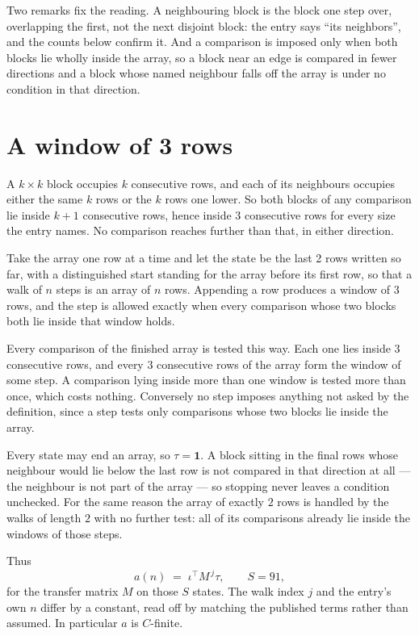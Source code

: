 \documentclass[11pt,a4paper]{article}
\theoremstyle{plain}
\theoremstyle{definition}
\begin{document}
Two remarks fix the reading. A neighbouring block is the block one step over, overlapping the
first, not the next disjoint block: the entry says ``its neighbors'', and the counts below
confirm it. And a comparison is imposed only when both blocks lie wholly inside the array, so a
block near an edge is compared in fewer directions and a block whose named neighbour falls off
the array is under no condition in that direction.

\section{A window of 3 rows}

A $k\times k$ block occupies $k$ consecutive rows, and each of its neighbours occupies either
the same $k$ rows or the $k$ rows one lower. So both blocks of any comparison lie inside $k+1$
consecutive rows, hence inside $3$ consecutive rows for every size the entry names. No
comparison reaches further than that, in either direction.

Take the array one row at a time and let the state be the last 2 rows written so far, with a
distinguished start standing for the array before its first row, so that a walk of $n$ steps is
an array of $n$ rows. Appending a row produces a window of $3$ rows, and the step is
allowed exactly when every comparison whose two blocks both lie inside that window holds.

Every comparison of the finished array is tested this way. Each one lies inside $3$
consecutive rows, and every $3$ consecutive rows of the array form the window of some
step. A comparison lying inside more than one window is tested more than once, which costs
nothing. Conversely no step imposes anything not asked by the definition, since a step tests
only comparisons whose two blocks lie inside the array.

Every state may end an array, so $\tau=\mathbf{1}$. A block sitting in the final rows whose
neighbour would lie below the last row is not compared in that direction at all --- the
neighbour is not part of the array --- so stopping never leaves a condition unchecked. For the
same reason the array of exactly $2$ rows is handled by the walks of length $2$ with no
further test: all of its comparisons already lie inside the windows of those steps.

Thus
\[
a(n)\;=\;\iota^{\!\top}M^{\,j}\tau ,\qquad S=91,
\]
for the transfer matrix $M$ on those $S$ states. The walk index $j$ and the entry's own $n$
differ by a constant, read off by matching the published terms rather than assumed. In
particular $a$ is $C$-finite.
\end{document}
